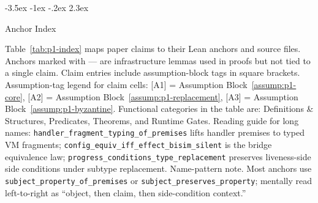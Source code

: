 \documentclass[a4paper,10pt,twocolumn,english]{article}
\makeatletter
\renewcommand{\section}{\@startsection{section}{1}{\z@}%
  {-3.5ex \@plus -1ex \@minus -.2ex}%
  {2.3ex}%
  {\raggedright\normalfont\large\bfseries}}
\numberwithin{equation}{section}
\theoremstyle{paperdef}
\theoremstyle{paperplain}
\theoremstyle{paperdef}
\theoremstyle{paperremark}
\makeatother
\begin{document}
\clearpage
\onecolumn

\section{Anchor Index}
\label{app:index}

Table~\ref{tab:p1-index} maps paper claims to their Lean anchors and source files. Anchors marked with --- are infrastructure lemmas used in proofs but not tied to a single claim. Claim entries include assumption-block tags in square brackets.
Assumption-tag legend for claim cells: [A1] = Assumption
Block~\ref{assump:p1-core}, [A2] = Assumption
Block~\ref{assump:p1-replacement}, [A3] = Assumption
Block~\ref{assump:p1-byzantine}.
Functional categories in the table are: Definitions \& Structures, Predicates,
Theorems, and Runtime Gates. Reading guide for long names:
\texttt{handler\_fragment\_typing\_of\_premises} lifts handler premises to typed
VM fragments; \texttt{config\_equiv\_iff\_effect\_bisim\_silent} is the bridge
equivalence law; \texttt{progress\_conditions\_type\_replacement} preserves
liveness-side side conditions under subtype replacement.
Name-pattern note. Most anchors use
\texttt{subject\_property\_of\_premises} or
\texttt{subject\_preserves\_property}; mentally read left-to-right as
``object, then claim, then side-condition context.''
\end{document}
